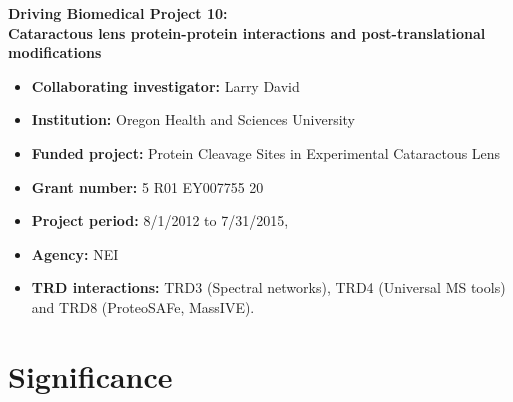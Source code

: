 \documentclass[arial,11pt]{article}
\begin{document}
\begin{center}
\Large
{\bf Driving Biomedical Project 10:\\Cataractous lens protein-protein interactions and post-translational modifications}
\normalsize
\end{center}

\begin{itemize}
\item {\bf Collaborating investigator:}  Larry David
\item {\bf Institution:} Oregon Health and Sciences University
\item {\bf Funded project:} 	Protein Cleavage Sites in Experimental Cataractous Lens
\item {\bf Grant number:} 	5 R01 EY007755 20   	
\item {\bf Project period:}   8/1/2012 to 7/31/2015,
\item {\bf Agency:}  NEI
\item {\bf TRD interactions:}  TRD3 (Spectral networks), TRD4 (Universal MS tools) and TRD8 (ProteoSAFe, MassIVE).
\end{itemize}


\section{Significance}

\end{document}
